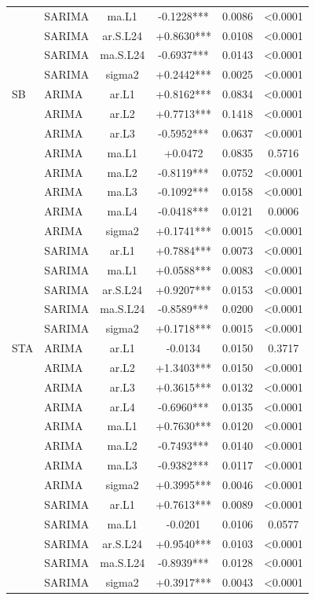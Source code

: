 \begin{table}[H]
\begin{tabular}{llcccc}
 & SARIMA & ma.L1 & -0.1228*** & 0.0086 & <0.0001 \\
 & SARIMA & ar.S.L24 & +0.8630*** & 0.0108 & <0.0001 \\
 & SARIMA & ma.S.L24 & -0.6937*** & 0.0143 & <0.0001 \\
 & SARIMA & sigma2 & +0.2442*** & 0.0025 & <0.0001 \\
\midrule
SB & ARIMA & ar.L1 & +0.8162*** & 0.0834 & <0.0001 \\
 & ARIMA & ar.L2 & +0.7713*** & 0.1418 & <0.0001 \\
 & ARIMA & ar.L3 & -0.5952*** & 0.0637 & <0.0001 \\
 & ARIMA & ma.L1 & +0.0472 & 0.0835 & 0.5716 \\
 & ARIMA & ma.L2 & -0.8119*** & 0.0752 & <0.0001 \\
 & ARIMA & ma.L3 & -0.1092*** & 0.0158 & <0.0001 \\
 & ARIMA & ma.L4 & -0.0418*** & 0.0121 & 0.0006 \\
 & ARIMA & sigma2 & +0.1741*** & 0.0015 & <0.0001 \\
 & SARIMA & ar.L1 & +0.7884*** & 0.0073 & <0.0001 \\
 & SARIMA & ma.L1 & +0.0588*** & 0.0083 & <0.0001 \\
 & SARIMA & ar.S.L24 & +0.9207*** & 0.0153 & <0.0001 \\
 & SARIMA & ma.S.L24 & -0.8589*** & 0.0200 & <0.0001 \\
 & SARIMA & sigma2 & +0.1718*** & 0.0015 & <0.0001 \\
\midrule
STA & ARIMA & ar.L1 & -0.0134 & 0.0150 & 0.3717 \\
 & ARIMA & ar.L2 & +1.3403*** & 0.0150 & <0.0001 \\
 & ARIMA & ar.L3 & +0.3615*** & 0.0132 & <0.0001 \\
 & ARIMA & ar.L4 & -0.6960*** & 0.0135 & <0.0001 \\
 & ARIMA & ma.L1 & +0.7630*** & 0.0120 & <0.0001 \\
 & ARIMA & ma.L2 & -0.7493*** & 0.0140 & <0.0001 \\
 & ARIMA & ma.L3 & -0.9382*** & 0.0117 & <0.0001 \\
 & ARIMA & sigma2 & +0.3995*** & 0.0046 & <0.0001 \\
 & SARIMA & ar.L1 & +0.7613*** & 0.0089 & <0.0001 \\
 & SARIMA & ma.L1 & -0.0201 & 0.0106 & 0.0577 \\
 & SARIMA & ar.S.L24 & +0.9540*** & 0.0103 & <0.0001 \\
 & SARIMA & ma.S.L24 & -0.8939*** & 0.0128 & <0.0001 \\
 & SARIMA & sigma2 & +0.3917*** & 0.0043 & <0.0001 \\
\bottomrule
\end{tabular}
\par{}
\end{table}
